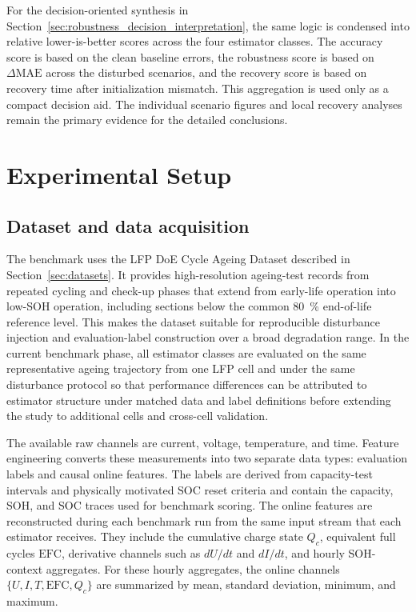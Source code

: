 \documentclass[
    a4paper,
    12pt,
    titlepage,
    bibliography=totoc,
    twoside=on,
    parskip=false,
    numbers=noenddot,
    cleardoublepage=empty,
    DIV=12,
    BCOR=12.0mm,
    headheight=36pt,
    headings=openright
]{scrreprt}
\begin{document}
For the decision-oriented synthesis in Section~\ref{sec:robustness_decision_interpretation}, the same logic is condensed into relative lower-is-better scores across the four estimator classes. The accuracy score is based on the clean baseline errors, the robustness score is based on $\Delta\mathrm{MAE}$ across the disturbed scenarios, and the recovery score is based on recovery time after initialization mismatch. This aggregation is used only as a compact decision aid. The individual scenario figures and local recovery analyses remain the primary evidence for the detailed conclusions.

\section{Experimental Setup}
\subsection{Dataset and data acquisition}
The benchmark uses the LFP DoE Cycle Ageing Dataset described in Section~\ref{sec:datasets}.\autocite{lfpDoeCycleAgingDataset2025} It provides high-resolution ageing-test records from repeated cycling and check-up phases that extend from early-life operation into low-SOH operation, including sections below the common \SI{80}{\percent} end-of-life reference level. This makes the dataset suitable for reproducible disturbance injection and evaluation-label construction over a broad degradation range. In the current benchmark phase, all estimator classes are evaluated on the same representative ageing trajectory from one LFP cell and under the same disturbance protocol so that performance differences can be attributed to estimator structure under matched data and label definitions before extending the study to additional cells and cross-cell validation.

The available raw channels are current, voltage, temperature, and time. Feature engineering converts these measurements into two separate data types: evaluation labels and causal online features. The labels are derived from capacity-test intervals and physically motivated SOC reset criteria and contain the capacity, SOH, and SOC traces used for benchmark scoring. The online features are reconstructed during each benchmark run from the same input stream that each estimator receives. They include the cumulative charge state $Q_c$, equivalent full cycles $\mathrm{EFC}$, derivative channels such as $dU/dt$ and $dI/dt$, and hourly SOH-context aggregates. For these hourly aggregates, the online channels $\{U,I,T,\mathrm{EFC},Q_c\}$ are summarized by mean, standard deviation, minimum, and maximum.
\end{document}

